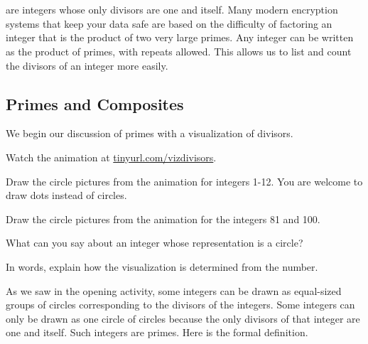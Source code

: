 \section{\secprimes}
\label{sec_primes}

 are integers whose only divisors are one and itself.  Many modern encryption systems that keep your data safe are based on the difficulty of factoring an integer that is the product of two very large primes.  %
Any integer can be written as the product of primes, with repeats allowed.  This  allows us to list and count the divisors of an integer more easily.

\newcommand{\subprimes}{Primes and Composites}
\subsection{\subprimes}
\label{sub_primes}

\begin{act}
\label{act_viz_divisors}  
    We begin our discussion of primes with a visualization of divisors.    
        \begin{actpart}
            \item Watch the animation at \url{tinyurl.com/vizdivisors}. %
            \item Draw the circle pictures from the animation for integers 1-12. You are welcome to draw dots instead of circles.
            \item Draw the circle pictures from the animation for the integers 81 and 100. 
            \item What can you say about an integer whose representation is a circle? 
            \item In words, explain how the visualization is determined from the number.
        \end{actpart}
\end{act}

As we saw in the opening activity, some integers can be drawn as equal-sized groups of circles corresponding to the divisors of the integers.  Some integers can only be drawn as one circle of circles because the only divisors of that integer are one and itself.  Such integers are primes.  Here is the formal definition.

